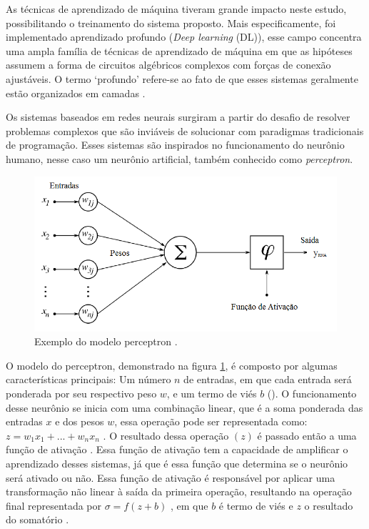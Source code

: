 As técnicas de aprendizado de máquina tiveram grande impacto neste estudo, possibilitando o treinamento do sistema proposto. Mais especificamente, foi implementado aprendizado profundo (\textit{Deep learning} (DL)), esse campo concentra uma ampla família de técnicas de aprendizado de máquina em que as hipóteses assumem a forma de circuitos algébricos complexos com forças de conexão ajustáveis. O termo ‘profundo’ refere-se ao fato de que esses sistemas geralmente estão organizados em camadas \cite{10.5555/1671238}.

Os sistemas baseados em redes neurais surgiram a partir do desafio de resolver problemas complexos que são inviáveis de solucionar com paradigmas tradicionais de programação. Esses sistemas são inspirados no funcionamento do neurônio humano, nesse caso um neurônio artificial, também conhecido como \textit{perceptron}.

\begin{figure}[h]
\centering\includegraphics[scale=0.4]{images/Figura-1-neuronio-artificial.png}
\caption{Exemplo do modelo perceptron \cite{imagemperceptron}.}
\label{fig: perceptron}
\end{figure}

O modelo do perceptron, demonstrado na figura \ref{fig: perceptron}, é composto por algumas características principais: Um número $n$ de entradas, em que cada entrada será ponderada por seu respectivo peso $w$, e um termo de viés \(b\) (). O funcionamento desse neurônio se inicia com uma combinação linear, que é a soma ponderada das entradas $x$ e dos pesos $w$, essa operação pode ser representada como: \(z = w_1  x_1 + ... + w_n  x_n\)  . O resultado dessa operação $(z)$ é passado então a uma função de ativação . Essa função de ativação tem a capacidade de amplificar o aprendizado desses sistemas, já que é essa função que determina se o neurônio será ativado ou não. Essa função de ativação é responsável por aplicar uma transformação não linear à saída da primeira operação, resultando na operação final representada por \(  \sigma  = f(z + b)\) , em que $b$ é termo de viés e $z$ o resultado do somatório \cite{haykin2009neural}. 


